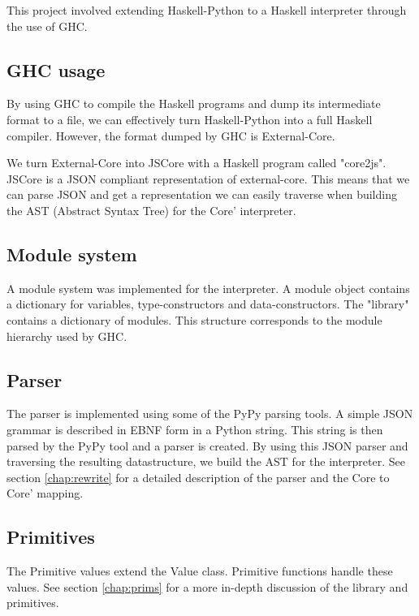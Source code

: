 This project involved extending Haskell-Python to a Haskell interpreter 
through the use of GHC.

\subsection{GHC usage}


By using GHC to compile the Haskell programs and dump its intermediate
format to a file, we can effectively turn Haskell-Python into a full
Haskell compiler. However, the format dumped by GHC is External-Core.

We turn External-Core into JSCore with a Haskell program called "core2js".
JSCore is a JSON compliant representation of external-core. This means that
we can parse JSON and get a representation we can easily traverse when building
the AST (Abstract Syntax Tree) for the Core' interpreter.

\subsection{Module system}

A module system was implemented for the interpreter. A module object contains
a dictionary for variables, type-constructors and data-constructors. The 
"library" contains a dictionary of modules. This structure corresponds to the
module hierarchy used by GHC.

\subsection{Parser}


The parser is implemented using some of the PyPy parsing tools. A simple 
JSON grammar is described in EBNF form in a Python string. This string
is then parsed by the PyPy tool and a parser is created. By using this JSON
parser and traversing the resulting datastructure, we build the AST for the 
interpreter. See section \ref{chap:rewrite} for a detailed description of 
the parser and the Core to Core' mapping.

\subsection{Primitives}

The Primitive values extend the Value class. Primitive functions handle
these values.
See section \ref{chap:prims} for a more in-depth discussion of the
library and primitives.

